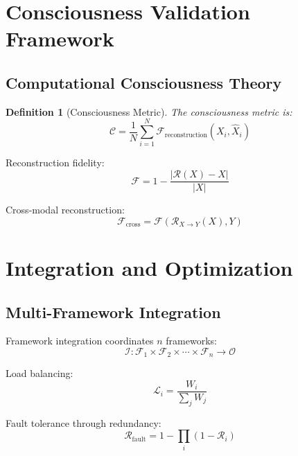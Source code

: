 \documentclass[12pt]{article}
\newtheorem{definition}[theorem]{Definition}
\begin{document}
\section{Consciousness Validation Framework}

\subsection{Computational Consciousness Theory}

\begin{definition}[Consciousness Metric]
The consciousness metric is:
\begin{equation}
\mathcal{C} = \frac{1}{N} \sum_{i=1}^{N} \mathcal{F}_{\text{reconstruction}}(X_i, \hat{X}_i)
\end{equation}
\end{definition}

Reconstruction fidelity:
\begin{equation}
\mathcal{F} = 1 - \frac{|\mathcal{R}(X) - X|}{|X|}
\end{equation}

Cross-modal reconstruction:
\begin{equation}
\mathcal{F}_{\text{cross}} = \mathcal{F}(\mathcal{R}_{X \rightarrow Y}(X), Y)
\end{equation}

\section{Integration and Optimization}

\subsection{Multi-Framework Integration}

Framework integration coordinates $n$ frameworks:
\begin{equation}
\mathcal{I}: \mathcal{F}_1 \times \mathcal{F}_2 \times \cdots \times \mathcal{F}_n \rightarrow \mathcal{O}
\end{equation}

Load balancing:
\begin{equation}
\mathcal{L}_i = \frac{W_i}{\sum_j W_j}
\end{equation}

Fault tolerance through redundancy:
\begin{equation}
\mathcal{R}_{\text{fault}} = 1 - \prod_i (1 - \mathcal{R}_i)
\end{equation}
\end{document}
